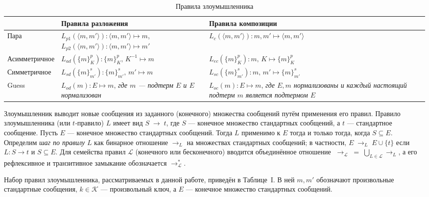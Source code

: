 \begin{table}[ht]
\centering
\small
\caption{Правила злоумышленника}
\begin{tabularx}{\linewidth}{|l|X|X|}
\hline
 & \textbf{Правила разложения} & \textbf{Правила композиции} \\
\hline
Пара & 
$L_{p1}(\langle m,m'\rangle)\colon \langle m,m'\rangle \mapsto m$,  \newline
$L_{p2}(\langle m,m'\rangle)\colon \langle m,m'\rangle \mapsto m'$ 
&
$L_{c}(\langle m,m'\rangle)\colon m,m' \mapsto \langle m,m'\rangle$ \\
\hline
Асимметричное & 
$L_{ad}(\{m\}_{K}^{p})\colon \{m\}_{K}^{p},\,K^{-1} \mapsto m$ 
&
$L_{ec}(\{m\}_{K}^{p})\colon m,\,K \mapsto \{m\}_{K}^{p}$ \\
\hline
Симметричное & 
$L_{sd}(\{m\}_{m'}^{s})\colon \{m\}_{m'}^{s},\,m' \mapsto m$ 
&
$L_{sc}(\{m\}_{m'}^{s})\colon m,\,m' \mapsto \{m\}_{m'}^{s}$ \\
\hline
Guess & 
$L_{od}(m)\colon E \mapsto m$, 
\emph{где $m$ — подтерм $E$ и $E$ нормализован} 
&
$L_{oc}(m)\colon E \mapsto m$, 
\emph{где $E,m$ нормализованы и каждый настоящий подтерм $m$ является подтермом $E$} \\
\hline
\end{tabularx}
\label{tab:intruder}
\end{table}

Злоумышленник выводит новые сообщения из заданного (конечного) множества сообщений путём применения его правил. Правило злоумышленника (или
\(t\)‑правило) \(L\) имеет вид $S \;\longrightarrow\; t$, где \(S\) — конечное множество стандартных сообщений, а \(t\) — стандартное сообщение.
Пусть \(E\) — конечное множество стандартных сообщений. Тогда \(L\) применимо к \(E\) тогда и только тогда, когда \(S \subseteq E\). Определим
\emph{шаг по правилу} \(L\) как бинарное отношение \(\to_{L}\) на множествах стандартных сообщений; в частности, $E \;\to_{L}\; E\cup\{t\}$ если
\(L\colon S\to t\) и \(S\subseteq E\). Для семейства правил \(\mathcal{L}\) (конечного или бесконечного) вводится объединённое отношение
$\;\to_{\mathcal{L}}\;=\;\bigcup_{L\in\mathcal{L}}\to_{L}$, а его рефлексивное и транзитивное замыкание обозначается \(\to_{\mathcal{L}}^{*}\).

Набор правил злоумышленника, рассматриваемых в данной работе, приведён в Таблице I. В ней \(m,m'\) обозначают произвольные стандартные сообщения, \(k\in\mathcal{K}\) — произвольный ключ, а \(E\) — конечное множество стандартных сообщений.

